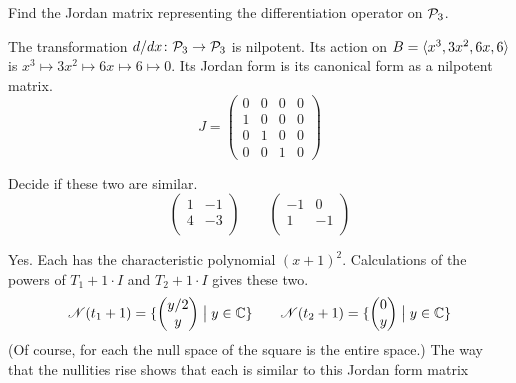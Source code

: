 \begin{exercises}
  \recommended \item 
    Find the Jordan matrix representing the differentiation
    operator on \( \mathcal{P}_3 \).
    \begin{answer}
      The transformation $\mbox{$d/dx\colon \mathcal{P}_3\to \mathcal{P}_3$}$ 
      is nilpotent.
      Its action on \( B=\langle x^3,3x^2,6x,6\rangle \)
      is $x^3\mapsto 3x^2\mapsto 6x\mapsto 6\mapsto 0$.
      Its Jordan form is its canonical form as a nilpotent matrix.
      \begin{equation*}
         J=
         \begin{pmatrix}
           0  &0  &0  &0  \\
           1  &0  &0  &0  \\
           0  &1  &0  &0  \\
           0  &0  &1  &0
         \end{pmatrix}
      \end{equation*}
    \end{answer}
   \recommended \item 
      Decide if these two are similar.
      \begin{equation*}
         \begin{pmatrix}
            1  &-1 \\
            4  &-3 \\
         \end{pmatrix}
         \qquad
         \begin{pmatrix}
           -1  &0  \\
            1  &-1 \\
         \end{pmatrix}
      \end{equation*}
      \begin{answer}
        Yes.
        Each has the characteristic polynomial $(x+1)^2$.
        Calculations of the powers of $T_1+1\cdot I$ and 
        $T_2+1\cdot I$ gives these two.
        \begin{equation*}
          \mathscr{N}(t_1+1)=\mbox{$\{\begin{pmatrix} y/2 \\ y \end{pmatrix} \bigm| y\in\mathbb{C}\}$}
          \qquad
          \mathscr{N}(t_2+1)=\mbox{$\{\begin{pmatrix} 0 \\ y \end{pmatrix} \bigm| y\in\mathbb{C}\}$}
        \end{equation*}
        (Of course, for each the null space of the square is 
        the entire space.)
        The way that the nullities rise shows that each is  
        similar to this Jordan form matrix
        \begin{equation*}

\end{equation*}
\end{answer}
\end{exercises}
